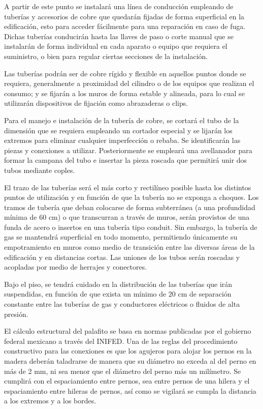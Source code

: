 \documentclass{article}
\begin{document}
\bigskip

A partir de este punto se instalará una línea de conducción empleando de tuberías y accesorios de cobre que quedarán fijadas de forma superficial en la edificación, esto para acceder fácilmente para una reparación en caso de fuga. Dichas tuberías conducirán hasta las llaves de paso o corte manual que se instalarán de forma individual en cada aparato o equipo que requiera el suministro, o bien para regular ciertas secciones de la instalación.


\bigskip

Las tuberías podrán ser de cobre rígido y flexible en aquellos puntos donde se requiera, generalmente a proximidad del cilindro o de los equipos que realizan el consumo; y se fijarán a los muros de forma estable y alineada, para lo cual se utilizarán dispositivos de fijación como abrazaderas o clips. 


\bigskip

Para el manejo e instalación de la tubería de cobre, se cortará el tubo de la dimensión que se requiera empleando un cortador especial y se lijarán los extremos para eliminar cualquier imperfección o rebaba. Se identificarán las piezas y conexiones a utilizar. Posteriormente se empleará una avellanador para formar la campana del tubo e insertar la pieza roscada que permitirá unir dos tubos mediante coples.


\bigskip

El trazo de las tuberías será el más corto y rectilíneo posible hasta los distintos puntos de utilización y en función de que la tubería no se exponga a choques. Los tramos de tubería que deban colocarse de forma subterránea (a una profundidad mínima de 60 cm) o que transcurran a través de muros, serán provistos de una funda de acero o insertos en una tubería tipo conduit. Sin embargo, la tubería de gas se mantendrá superficial en todo momento, permitiendo únicamente su empotramiento en muros como medio de transición entre las diversas áreas de la edificación y en distancias cortas. Las uniones de los tubos serán roscadas y acopladas por medio de herrajes y conectores. 


\bigskip

Bajo el piso, se tendrá cuidado en la distribución de las tuberías que irán suspendidas, en función de que exista un mínimo de 20 cm de separación constante entre las tuberías de gas y conductores eléctricos o fluidos de alta presión.


\bigskip

El cálculo estructural del palafito se basa en normas publicadas por el gobierno federal mexicano a través del INIFED. Una de las reglas del procedimiento constructivo para las conexiones es que los agujeros para alojar los pernos en la madera deberán taladrarse de manera que su diámetro no exceda al del perno en más de 2 mm, ni sea menor que el diámetro del perno más un milímetro. Se cumplirá con el espaciamiento entre pernos, sea entre pernos de una hilera y el espaciamiento entre hileras de pernos, así como se vigilará se cumpla la distancia a los extremos y a los bordes.
\end{document}
